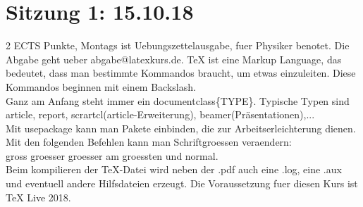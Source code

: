 \documentclass{scrartcl}
\begin{document}
\section{Sitzung 1: 15.10.18}
2 ECTS Punkte, Montags ist Uebungszettelausgabe, fuer Physiker benotet. Die Abgabe geht ueber abgabe@latexkurs.de. TeX ist eine Markup Language, das bedeutet, dass man bestimmte Kommandos braucht, um etwas einzuleiten. Diese Kommandos beginnen mit einem Backslash. \\
Ganz am Anfang steht immer ein documentclass\{TYPE\}. Typische Typen sind article, report, scrartcl(article-Erweiterung), beamer(Präsentationen),... \\
Mit usepackage kann man Pakete einbinden, die zur Arbeitserleichterung dienen. \\
Mit den folgenden Befehlen kann man Schriftgroessen veraendern:\\
{\large gross} {\Large  groesser} {\LARGE  groesser} {\Huge am groessten} {\normalsize  und normal.} \\
Beim kompilieren der TeX-Datei wird neben der .pdf auch eine .log, eine .aux und eventuell andere Hilfsdateien erzeugt.
Die Voraussetzung fuer diesen Kurs ist TeX Live 2018.
\end{document}
